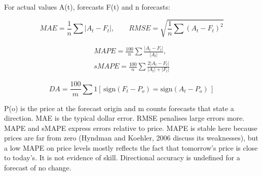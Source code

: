 \documentclass[11pt,a4paper]{article}
\begin{document}
For actual values A(t), forecasts F(t) and n forecasts:

\begin{equation}
MAE=\frac{1}{n}\sum|A_t-F_t|,\qquad RMSE=\sqrt{\frac{1}{n}\sum(A_t-F_t)^2}
\end{equation}

\begin{equation}
\begin{gathered}
MAPE=\frac{100}{n}\sum\frac{|A_t-F_t|}{|A_t|},\\ sMAPE=\frac{100}{n}\sum\frac{2|A_t-F_t|}{|A_t|+|F_t|}
\end{gathered}
\end{equation}

\begin{equation}
DA=\frac{100}{m}\sum 1[\,\mathrm{sign}(F_t-P_o)=\mathrm{sign}(A_t-P_o)\,]
\end{equation}

P(o) is the price at the forecast origin and m counts forecasts that state a direction. MAE is the typical dollar error. RMSE penalises large errors more. MAPE and sMAPE express errors relative to price. MAPE is stable here because prices are far from zero (Hyndman and Koehler, 2006 discuss its weaknesses), but a low MAPE on price levels mostly reflects the fact that tomorrow's price is close to today's. It is not evidence of skill. Directional accuracy is undefined for a forecast of no change.
\end{document}
